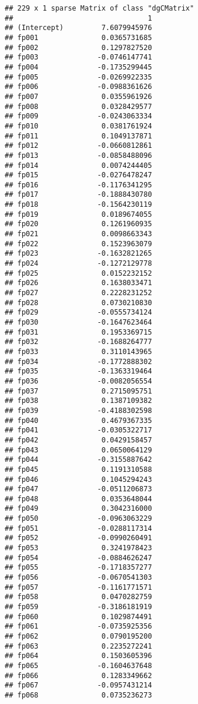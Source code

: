 \documentclass[]{article}
\begin{document}
\begin{verbatim}
## 229 x 1 sparse Matrix of class "dgCMatrix"
##                                1
## (Intercept)         7.6079945976
## fp001               0.0365731685
## fp002               0.1297827520
## fp003              -0.0746147741
## fp004              -0.1735299445
## fp005              -0.0269922335
## fp006              -0.0988361626
## fp007               0.0355961926
## fp008               0.0328429577
## fp009              -0.0243063334
## fp010               0.0381761924
## fp011               0.1049137871
## fp012              -0.0660812861
## fp013              -0.0858488096
## fp014               0.0074244405
## fp015              -0.0276478247
## fp016              -0.1176341295
## fp017              -0.1888430780
## fp018              -0.1564230119
## fp019               0.0189674055
## fp020               0.1261960935
## fp021               0.0098663343
## fp022               0.1523963079
## fp023              -0.1632821265
## fp024              -0.1272129778
## fp025               0.0152232152
## fp026               0.1638033471
## fp027               0.2228231252
## fp028               0.0730210830
## fp029              -0.0555734124
## fp030              -0.1647623464
## fp031               0.1953369715
## fp032              -0.1688264777
## fp033               0.3110143965
## fp034              -0.1772888302
## fp035              -0.1363319464
## fp036              -0.0082056554
## fp037               0.2715095751
## fp038               0.1387109382
## fp039              -0.4188302598
## fp040               0.4679367335
## fp041              -0.0305322717
## fp042               0.0429158457
## fp043               0.0650064129
## fp044              -0.3155887642
## fp045               0.1191310588
## fp046               0.1045294243
## fp047              -0.0511206873
## fp048               0.0353648044
## fp049               0.3042316000
## fp050              -0.0963063229
## fp051              -0.0288117314
## fp052              -0.0990260491
## fp053               0.3241978423
## fp054              -0.0884626247
## fp055              -0.1718357277
## fp056              -0.0670541303
## fp057              -0.1161771571
## fp058               0.0470282759
## fp059              -0.3186181919
## fp060               0.1029874491
## fp061              -0.0735925356
## fp062               0.0790195200
## fp063               0.2235272241
## fp064               0.1503605396
## fp065              -0.1604637648
## fp066               0.1283349662
## fp067              -0.0957431214
## fp068               0.0735236273

\end{verbatim}
\end{document}

